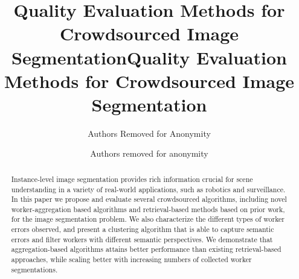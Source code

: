 \documentclass[letterpaper]{article} %
\title{Quality Evaluation Methods for Crowdsourced Image Segmentation}
\author{Authors Removed for Anonymity}
\begin{document}
           \title{Quality Evaluation Methods for Crowdsourced Image Segmentation}
           \author{Authors removed for anonymity}
           \maketitle
           \begin{abstract}
           Instance-level image segmentation provides rich information crucial for scene understanding in a variety of real-world applications, such as robotics and surveillance. In this paper we propose and evaluate several crowdsourced algorithms, including novel worker-aggregation based algorithms and retrieval-based methods based on prior work, for the image segmentation problem. We also characterize the different types of worker errors observed, and present a clustering algorithm that is able to capture semantic errors and filter workers with different semantic perspectives. We demonstrate that aggregation-based algorithms attains better performance than existing retrieval-based approaches, while scaling better with increasing numbers of collected worker segmentations. 
          \end{abstract}
               
          
          
          
          
          
          
          
          



\end{document}
